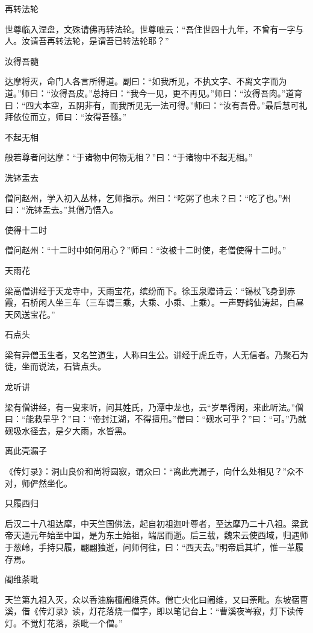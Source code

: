 \documentclass[a4paper,12pt,UTF8,twoside]{ctexbook}
\begin{document}
    再转法轮
    
    世尊临入涅盘，文殊请佛再转法轮。世尊咄云：“吾住世四十九年，不曾有一字与人。汝请吾再转法轮，是谓吾已转法轮耶？”
    
    汝得吾髓
    
    达摩将灭，命门人各言所得道。副曰：“如我所见，不执文字、不离文字而为道。”师曰：“汝得吾皮。”总持曰：“我今一见，更不再见。”师曰：“汝得吾肉。”道育曰：“四大本空，五阴非有，而我所见无一法可得。”师曰：“汝有吾骨。”最后慧可礼拜依位而立，师曰：“汝得吾髓。”
    
    不起无相
    
    般若尊者问达摩：“于诸物中何物无相？”曰：“于诸物中不起无相。”
    
    洗钵盂去
    
    僧问赵州，学入初入丛林，乞师指示。州曰：“吃粥了也未？曰：“吃了也。”州曰：“洗钵盂去。”其僧乃悟入。
    
    使得十二时
    
    僧问赵州：“十二时中如何用心？”师曰：“汝被十二时使，老僧使得十二时。”
    
    天雨花
    
    梁高僧讲经于天龙寺中，天雨宝花，缤纷而下。徐玉泉赠诗云：“锡杖飞身到赤霞，石桥闲人坐三车（三车谓三乘，大乘、小乘、上乘）。一声野鹤仙涛起，白昼天风送宝花。”
    
    石点头
    
    梁有异僧玉生者，又名竺道生，人称曰生公。讲经于虎丘寺，人无信者。乃聚石为徒，坐而说法，石皆点头。
    
    龙听讲
    
    梁有僧讲经，有一叟来听，问其姓氏，乃潭中龙也，云“岁旱得闲，来此听法。”僧曰：“能救旱乎？”曰：“帝封江湖，不得擅用。”僧曰：“砚水可乎？”曰：“可。”乃就砚吸水径去，是夕大雨，水皆黑。
    
    离此壳漏子
    
    《传灯录》：洞山良价和尚将圆寂，谓众曰：“离此壳漏子，向什么处相见？”众不对，师俨然坐化。
    
    只履西归
    
    后汉二十八祖达摩，中天竺国佛法，起自初祖迦叶尊者，至达摩乃二十八祖。梁武帝天通元年始至中国，是为东土始祖，端居而逝。后三载，魏宋云使西域，归遇师于葱岭，手持只履，翩翩独逝，问师何往，曰：“西天去。”明帝启其圹，惟一革履存焉。
    
    阇维荼毗
    
    天竺第九祖入灭，众以香油旃檀阇维真体。僧亡火化曰阇维，又曰荼毗。东坡宿曹溪，借《传灯录》读，灯花落烧一僧字，即以笔记台上：“曹溪夜岑寂，灯下读传灯。不觉灯花落，荼毗一个僧。”
    
\end{document}
